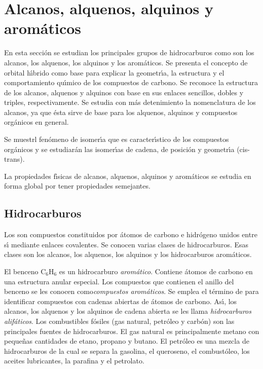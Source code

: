 \section {Alcanos, alquenos, alquinos y aro\-m\'a\-ti\-cos}

En esta secci\'on se estudian los principales grupos de hidrocarburos como son los 
alcanos, los alquenos, los alquinos y los aro\-m\'a\-ti\-cos. Se presenta el concepto de orbital
h\'{\i}brido co\-mo base para explicar la geometr\'{\i}a, la estructura y el
comportamiento qu\'{\i}mico de los compuestos de carbono. Se reconoce la estructura de
los alcanos, alquenos y alquinos con base en sus enlaces sencillos, dobles y triples, 
respectivamente. Se estudia con m\'as detenimiento la nomenclatura de los alcanos, ya
que \'esta sirve de base para los alquenos, alquinos y compuestos org\'anicos en
general.

Se muestrl fen\'omeno de isomer\'{\i}a que es caracter\'{\i}stico de los compuestos org\'anicos y se estudiar\'an las isomer\'{\i}as de cadena, de posici\'on y
geometr\'{\i}a (cis-trans).

La propiedades f\'{\i}sicas de alcanos, alquenos, alquinos y arom\'aticos se estudia en
forma global por tener propiedades semejantes.

\subsection{Hidrocarburos}
Los \textbf{}  son compuestos constituidos por \'atomos de carbono e hi\-dr\'o\-ge\-no unidos entre s\'{\i} mediante
enlaces covalentes. Se conocen varias clases de hidrocarburos. Esas clases son los alcanos, los alquenos, los al\-qui\-nos y los hidrocarburos arom\'aticos.

El benceno C$_6$H$_6$ es un hidrocarburo \textit{arom\'atico}. Contiene
\'atomos de car\-bono en una estructura anular especial. Los compuestos que contienen el
 anillo del benceno se les conocen como\textit{compuestos
arom\'aticos}. Se emplea el t\'ermino de \textit{} para identificar compuestos con cadenas abiertas de \'atomos de
carbono. As\'{\i}, los alcanos, los alquenos y los alquinos de cadena abierta se les llama \textit{hidrocarburos alif\'aticos}. Los combustibles f\'osiles (gas natural,
petr\'oleo y carb\'on) son las principales fuentes de hidrocarburos. El gas natural es principalmente metano con pe\-que\-\~nas cantidades de etano, propano y butano. El petr\'oleo es una mezcla de hidrocarburos de la cual se separa la gasolina, el queroseno, el combust\'oleo, los aceites lubricantes, la parafina y el petrolato.


